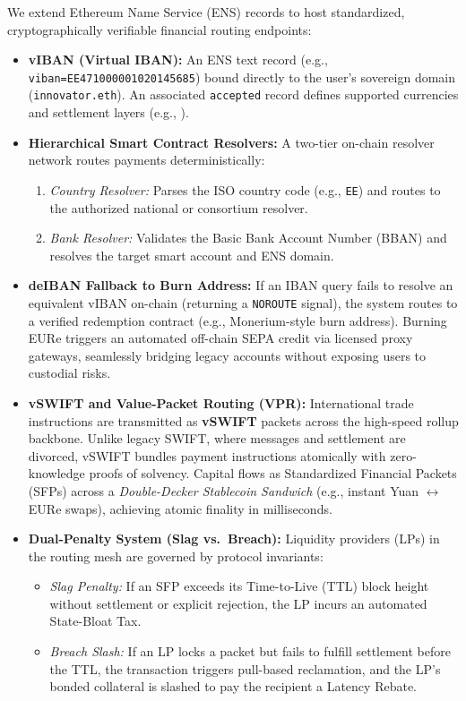 \documentclass[a4paper,11pt,twoside,parskip=half-,headings=small]{scrartcl}
\newcommand{\code}[1]{\texttt{#1}}
\begin{document}
We extend Ethereum Name Service (ENS) records to host standardized, cryptographically verifiable financial routing endpoints:
\begin{itemize}[nosep]
  \item \textbf{vIBAN (Virtual IBAN):} An ENS text record (e.g., \code{viban=EE471000001020145685}) bound directly to the user's sovereign domain (\code{innovator.eth}). An associated \code{accepted} record defines supported currencies and settlement layers (e.g., ).
  \item \textbf{Hierarchical Smart Contract Resolvers:} A two-tier on-chain resolver network routes payments deterministically:
  \begin{enumerate}[label=(\alph*),nosep]
    \item \emph{Country Resolver:} Parses the ISO country code (e.g., \code{EE}) and routes to the authorized national or consortium resolver.
    \item \emph{Bank Resolver:} Validates the Basic Bank Account Number (BBAN) and resolves the target smart account and ENS domain.
  \end{enumerate}
  \item \textbf{deIBAN Fallback to Burn Address:} If an IBAN query fails to resolve an equivalent vIBAN on-chain (returning a \code{NOROUTE} signal), the system routes to a verified redemption contract (e.g., Monerium-style burn address). Burning EURe triggers an automated off-chain SEPA credit via licensed proxy gateways, seamlessly bridging legacy accounts without exposing users to custodial risks.
  \item \textbf{vSWIFT and Value-Packet Routing (VPR):} International trade instructions are transmitted as \textbf{vSWIFT} packets across the high-speed rollup backbone. Unlike legacy SWIFT, where messages and settlement are divorced, vSWIFT bundles payment instructions atomically with zero-knowledge proofs of solvency. Capital flows as Standardized Financial Packets (SFPs) across a \emph{Double-Decker Stablecoin Sandwich} (e.g., instant Yuan $\leftrightarrow$ EURe swaps), achieving atomic finality in milliseconds.
  \item \textbf{Dual-Penalty System (Slag vs.\ Breach):} Liquidity providers (LPs) in the routing mesh are governed by protocol invariants:
  \begin{itemize}[nosep]
    \item \emph{Slag Penalty:} If an SFP exceeds its Time-to-Live (TTL) block height without settlement or explicit rejection, the LP incurs an automated State-Bloat Tax.
    \item \emph{Breach Slash:} If an LP locks a packet but fails to fulfill settlement before the TTL, the transaction triggers pull-based reclamation, and the LP's bonded collateral is slashed to pay the recipient a Latency Rebate.
  \end{itemize}
\end{itemize}
\end{document}
